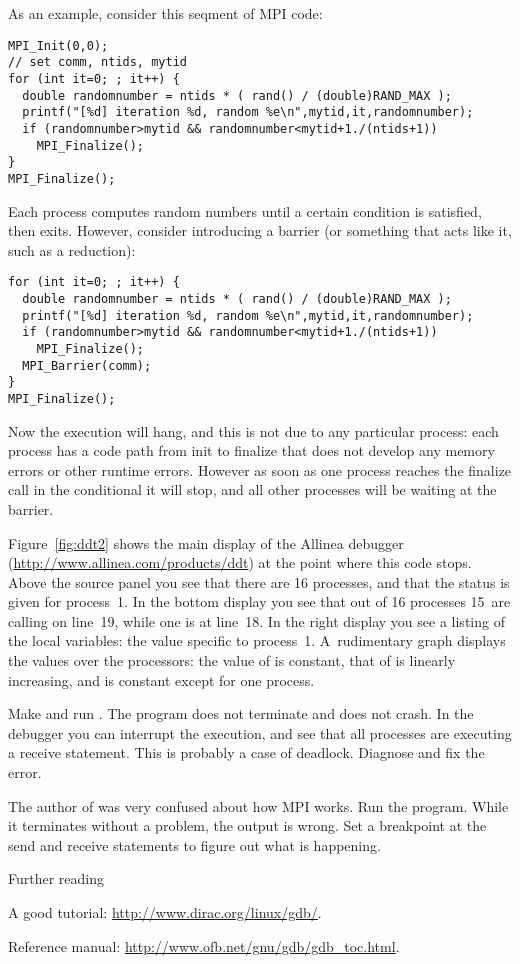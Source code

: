 As an example, consider this seqment of MPI code:
\begin{verbatim}
MPI_Init(0,0);
// set comm, ntids, mytid
for (int it=0; ; it++) {
  double randomnumber = ntids * ( rand() / (double)RAND_MAX );
  printf("[%d] iteration %d, random %e\n",mytid,it,randomnumber);
  if (randomnumber>mytid && randomnumber<mytid+1./(ntids+1))  
    MPI_Finalize();
}
MPI_Finalize();
\end{verbatim}
Each process computes random numbers until a certain condition is satisfied, then exits.
However, consider introducing a barrier (or something that acts like it, such as a reduction):
\begin{verbatim}
for (int it=0; ; it++) {
  double randomnumber = ntids * ( rand() / (double)RAND_MAX );
  printf("[%d] iteration %d, random %e\n",mytid,it,randomnumber);
  if (randomnumber>mytid && randomnumber<mytid+1./(ntids+1))  
    MPI_Finalize();
  MPI_Barrier(comm);
}
MPI_Finalize();
\end{verbatim}
Now the execution will hang, and this is not due to any particular process:
each process has a code path from init to finalize that does not develop
any memory errors or other runtime errors.
However as soon as one process reaches the finalize call in the conditional
it will stop, and all other processes will be waiting at the barrier.

Figure~\ref{fig:ddt2} shows the main display of the Allinea 
debugger (\url{http://www.allinea.com/products/ddt}) at the point where this code stops.
Above the source panel you see that there are 16 processes, and that the status is given
for process~1.
In the bottom display you see that out of 16 processes 15~are calling  on line~19,
while one is at line~18. In the right display you see a listing of the local variables:
the value specific to process~1. A~rudimentary graph displays the values over the processors:
the value of  is constant, that of  is linearly increasing, and 
is constant except for one process.

\begin{exercise}
  Make and run . The program does not terminate and does not crash.
  In the debugger you can interrupt the execution, and see that all processes
  are executing a receive statement. This is probably a case of deadlock.
  Diagnose and fix the error.
\end{exercise}

\begin{exercise}
  The author of  was very confused about how MPI works. Run the program.
  While it terminates without a problem, the output is wrong. Set a breakpoint
  at the send and receive statements to figure out what is happening.
\end{exercise}



 {Further reading}

A good tutorial: \url{http://www.dirac.org/linux/gdb/}.

Reference manual: \url{http://www.ofb.net/gnu/gdb/gdb_toc.html}.

